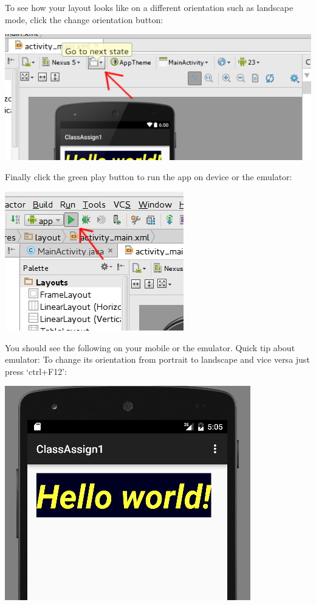 To see how your layout looks like on a different orientation such as landscape mode, click the change orientation button:

\begin{center}
	\includegraphics[scale=0.4]{chapters/ch02/images/22_state}
\end{center}

Finally click the green play button to run the app on device or the emulator:

\begin{center}
	\includegraphics[scale=0.4]{chapters/ch02/images/23_play}
\end{center}

You should see the following on your mobile or the emulator. Quick tip about emulator: To change its orientation from portrait to landscape and vice versa just press `ctrl+F12':

\begin{center}
	\includegraphics[scale=0.4]{chapters/ch02/images/24_device}
\end{center}

